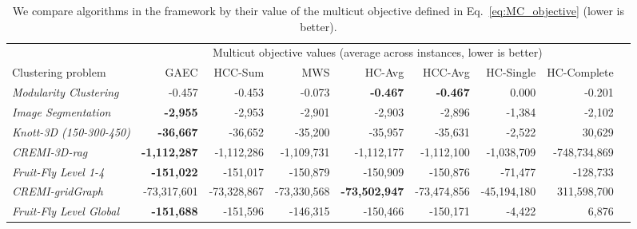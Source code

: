 \begin{table}[t]
    \centering
    \tiny
    \begin{subtable}[t!]{\textwidth}
    \centering
        \begin{tabular}{l | r r r r r r r r}
        &\multicolumn{7}{c}{Multicut objective values (average across instances, lower is better)} \\
        Clustering problem & \multicolumn{1}{r}{GAEC \cite{keuper2015efficient}} & HCC-Sum & MWS \cite{wolf2018mutex} & HC-Avg & HCC-Avg & HC-Single & HC-Complete \\ \midrule
        \emph{Modularity Clustering} & 
        -0.457 & -0.453 & -0.073 & \textbf{-0.467} & \textbf{-0.467} & 0.000 & -0.201 \\ 
        \emph{Image Segmentation}  & 
        \textbf{-2,955} & -2,953 & -2,901 & -2,903 & -2,896 & -1,384 &  -2,102 \\
        \emph{Knott-3D (150-300-450)}  & 
        \textbf{-36,667} & -36,652 & -35,200 & -35,957 & -35,631 & -2,522 & 30,629 \\
        \emph{CREMI-3D-rag}  
        & \textbf{-1,112,287} & -1,112,286& -1,109,731 & -1,112,177 & -1,112,100 & -1,038,709 & -748,734,869 \\ 
        \emph{Fruit-Fly Level 1-4}
        & \textbf{-151,022} & -151,017 & -150,879 & -150,909 & -150,876 & -71,477 & -128,733 \\
        \emph{CREMI-gridGraph} 
        & -73,317,601 & -73,328,867 & -73,330,568 & \textbf{-73,502,947} & -73,474,856 & -45,194,180 & 311,598,700 \\
        \emph{Fruit-Fly Level Global} 
        & \textbf{-151,688} & -151,596 & -146,315 & -150,466 & -150,171 & -4,422 & 6,876 \\



        \end{tabular}
    \end{subtable} 
    \caption{We compare algorithms in the \algname{} framework by their value of the multicut objective defined in Eq.~\ref{eq:MC_objective} (lower is better).} 
    \label{tab:energies}
\end{table}

